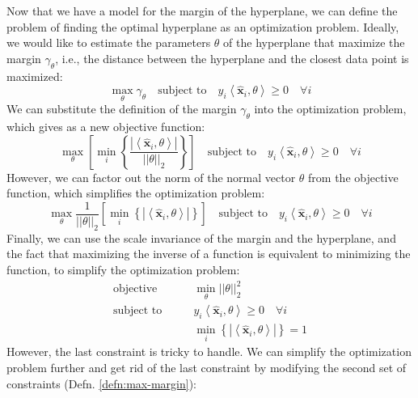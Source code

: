 \documentclass{article}[11pt]
\newcommand{\norm}[1]{\left|\left|#1\right|\right|}
\begin{document}
Now that we have a model for the margin of the hyperplane, we can define the problem of finding the optimal hyperplane as an optimization problem.
Ideally, we would like to estimate the parameters $\theta$ of the hyperplane that maximize the margin $\gamma_{\theta}$, i.e., the distance between the hyperplane and the closest data point is maximized:
\begin{equation*}\label{eq:max-margin}
    \max_{\theta}\gamma_{\theta}\quad\text{subject to}\quad y_{i}\left<\hat{\mathbf{x}}_{i},\theta\right> \geq 0\quad\forall i
\end{equation*}
We can substitute the definition of the margin $\gamma_{\theta}$ into the optimization problem, which gives as a new objective function:
\begin{equation*}
    \max_{\theta}\left[\min_{i}\left\{\frac{|\left<\hat{\mathbf{x}}_{i},\theta\right>|}{\norm{\theta}_{2}}\right\}\right]\quad\text{subject to}\quad y_{i}\left<\hat{\mathbf{x}}_{i},\theta\right> \geq 0\quad\forall i
\end{equation*}
However, we can factor out the norm of the normal vector $\theta$ from the objective function, which simplifies the optimization problem:
\begin{equation*}
    \max_{\theta}\frac{1}{\norm{\theta}_{2}}\left[\min_{i}\left\{|\left<\hat{\mathbf{x}}_{i},\theta\right>|\right\}\right]\quad\text{subject to}\quad y_{i}\left<\hat{\mathbf{x}}_{i},\theta\right> \geq 0\quad\forall i
\end{equation*}
Finally, we can use the scale invariance of the margin and the hyperplane, and the fact that maximizing the inverse of a function is equivalent to minimizing the function, 
to simplify the optimization problem:
\begin{align*}
    \text{objective}\qquad & \min_{\theta}\norm{\theta}_{2}^{2}\\
    \text{subject to}\qquad & y_{i}\left<\hat{\mathbf{x}}_{i},\theta\right> \geq 0\quad\forall i\\
    & \min_{i}\left\{|\left<\hat{\mathbf{x}}_{i},\theta\right>|\right\} = 1
\end{align*}
However, the last constraint is tricky to handle. 
We can simplify the optimization problem further and get rid of the last constraint by modifying the second set of constraints (Defn. \ref{defn:max-margin}):
\end{document}
